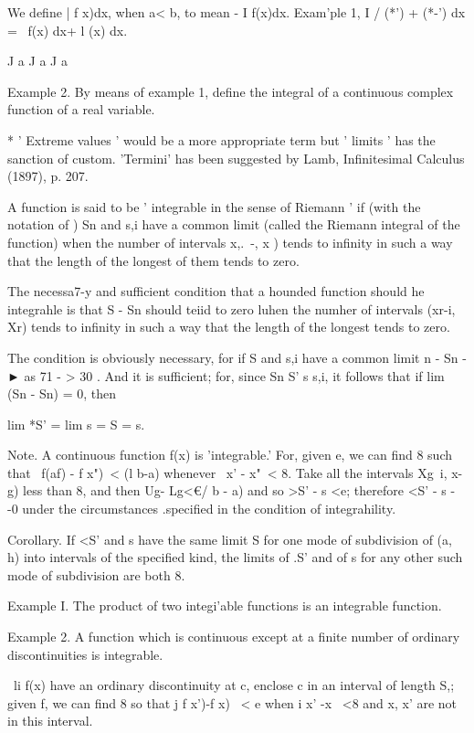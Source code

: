 We define | f x)dx, when a< b, to mean - I f(x)dx. Exam'ple 1, I /
(*') + (*-') dx = \ f(x) dx+ l (x) dx.

J a J a J a

Example 2. By means of example 1, define the integral of a continuous
complex function of a real variable.

* ' Extreme values ' would be a more appropriate term but ' limits '
has the sanction of custom. 'Termini' has been suggested by Lamb,
Infinitesimal Calculus (1897), p. 207.

%
%


A function is said to be ' integrable in the sense of Riemann ' if
(with the notation of ) Sn and s,i have a common limit (called
the Riemann integral of the function) when the number of intervals
x,.\ -, x ) tends to infinity in such a way that the length of the
longest of them tends to zero.

The necessa7-y and sufficient condition that a hounded function should
he integrahle is that S - Sn should teiid to zero luhen the numher of
intervals (xr-i, Xr) tends to infinity in such a way that the length
of the longest tends to zero.

The condition is obviously necessary, for if S and s,i have a common
limit n - Sn - ► as 71 - > 30 . And it is sufficient; for, since Sn
S' s s,i, it follows that if lim (Sn - Sn) = 0, then

lim *S' = lim s = S = s.

Note. A continuous function f(x) is 'integrable.' For, given e, we can
find 8 such that \ f(af) - f x")\ < (l b-a) whenever \ x' - x"\ < 8.
Take all the intervals Xg\ i, x-g) less than 8, and then Ug- Lg<€/ b -
a) and so >S' - s <e; therefore <S' - s - -0 under the circumstances
.specified in the condition of integrahility.

Corollary. If <S' and s have the same limit S for one mode of
subdivision of (a, h) into intervals of the specified kind, the limits
of .S' and of s for any other such mode of subdivision are both 8.

Example I. The product of two integi'able functions is an integrable
function.

Example 2. A function which is continuous except at a finite number of
ordinary discontinuities is integrable.

\ li f(x) have an ordinary discontinuity at c, enclose c in an
interval of length S,; given f, we can find 8 so that j f x')-f x) \
< e when i x' -x \ <8 and x, x' are not in this interval.

